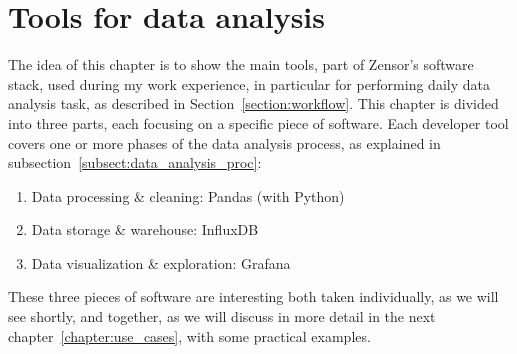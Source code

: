 \chapter{Tools for data analysis}\label{chapter:tools}
The idea of this chapter is to show the main tools, part of Zensor's software stack, used during my work experience, in particular for performing daily data analysis task, as described in Section~\ref{section:workflow}.
This chapter is divided into three parts, each focusing on a specific piece of software. Each developer tool covers one or more phases of the data analysis process, as explained in subsection~\ref{subsect:data_analysis_proc}:
\begin{enumerate}
    \item Data processing \& cleaning: Pandas (with Python)
    \item Data storage \& warehouse: InfluxDB
    \item Data visualization \& exploration: Grafana
\end{enumerate}
These three pieces of software are interesting both taken individually, as we will see shortly, and together, as we will discuss in more detail in the next chapter~\ref{chapter:use_cases}, with some practical examples.




